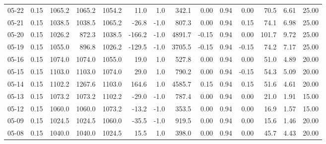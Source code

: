 \begin{threeparttable}
{\begin{tabular}{lrrrrrrrrrrrrr}
  05-22 &     0.15 & 1065.2 & 1065.2 & 1054.2 &       11.0 &                      1.0 &               342.1 &       0.00 &      0.94 &           0.00 &             70.5 &            6.61 &                  25.00 \\
  05-21 &     0.15 & 1038.5 & 1038.5 & 1065.2 &      -26.8 &                     -1.0 &               807.3 &       0.00 &      0.94 &           0.15 &             74.1 &            6.98 &                  25.00 \\
  05-20 &     0.15 & 1026.2 &  872.3 & 1038.5 &     -166.2 &                     -1.0 &              4891.7 &      -0.15 &      0.94 &           0.00 &            101.7 &            9.72 &                  25.00 \\
  05-19 &     0.15 & 1055.0 &  896.8 & 1026.2 &     -129.5 &                     -1.0 &              3705.5 &      -0.15 &      0.94 &          -0.15 &             74.2 &            7.17 &                  25.00 \\
  05-16 &     0.15 & 1074.0 & 1074.0 & 1055.0 &       19.0 &                      1.0 &               527.8 &       0.00 &      0.94 &           0.00 &             51.0 &            4.89 &                  20.00 \\
  05-15 &     0.15 & 1103.0 & 1103.0 & 1074.0 &       29.0 &                      1.0 &               790.2 &       0.00 &      0.94 &          -0.15 &             54.3 &            5.09 &                  20.00 \\
  05-14 &     0.15 & 1102.2 & 1267.6 & 1103.0 &      164.6 &                      1.0 &              4585.7 &       0.15 &      0.94 &           0.15 &             51.6 &            4.61 &                  20.00 \\
  05-13 &     0.15 & 1073.2 & 1073.2 & 1102.2 &      -29.0 &                     -1.0 &               787.4 &       0.00 &      0.94 &           0.00 &             21.0 &            1.91 &                  15.00 \\
  05-12 &     0.15 & 1060.0 & 1060.0 & 1073.2 &      -13.2 &                     -1.0 &               353.5 &       0.00 &      0.94 &           0.00 &             16.9 &            1.57 &                  15.00 \\
  05-09 &     0.15 & 1024.5 & 1024.5 & 1060.0 &      -35.5 &                     -1.0 &               919.5 &       0.00 &      0.94 &           0.00 &             15.6 &            1.46 &                  20.00 \\
  05-08 &     0.15 & 1040.0 & 1040.0 & 1024.5 &       15.5 &                      1.0 &               398.0 &       0.00 &      0.94 &           0.00 &             45.7 &            4.43 &                  20.00 \\

\end{tabular}}
\end{threeparttable}
